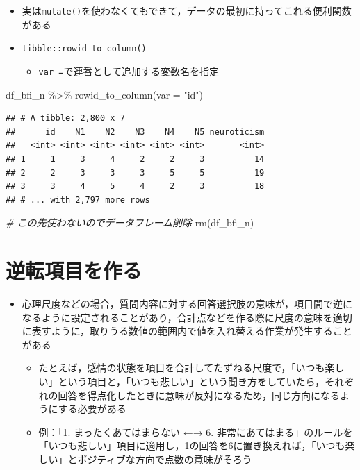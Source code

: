 \documentclass[
  xelatex,ja=standard, b5paper]{bxjsbook}
\newenvironment{Shaded}{\begin{snugshade}}{\end{snugshade}}
\newcommand{\AttributeTok}[1]{\textcolor[rgb]{0.77,0.63,0.00}{#1}}
\newcommand{\CommentTok}[1]{\textcolor[rgb]{0.56,0.35,0.01}{\textit{#1}}}
\newcommand{\FunctionTok}[1]{\textcolor[rgb]{0.00,0.00,0.00}{#1}}
\newcommand{\NormalTok}[1]{#1}
\newcommand{\SpecialCharTok}[1]{\textcolor[rgb]{0.00,0.00,0.00}{#1}}
\newcommand{\StringTok}[1]{\textcolor[rgb]{0.31,0.60,0.02}{#1}}
\providecommand{\tightlist}{%
  \setlength{\itemsep}{0pt}\setlength{\parskip}{0pt}}
\begin{document}
\begin{itemize}
\tightlist
\item
  実は\texttt{mutate()}を使わなくてもできて，データの最初に持ってこれる便利関数がある
\item
  \texttt{tibble::rowid\_to\_column()}

  \begin{itemize}
  \tightlist
  \item
    \texttt{var\ =}で連番として追加する変数名を指定
  \end{itemize}
\end{itemize}

\begin{Shaded}
\begin{Highlighting}[]
\NormalTok{df\_bfi\_n }\SpecialCharTok{\%\textgreater{}\%} 
  \FunctionTok{rowid\_to\_column}\NormalTok{(}\AttributeTok{var =} \StringTok{"id"}\NormalTok{)}
\end{Highlighting}
\end{Shaded}

\begin{verbatim}
## # A tibble: 2,800 x 7
##      id    N1    N2    N3    N4    N5 neuroticism
##   <int> <int> <int> <int> <int> <int>       <int>
## 1     1     3     4     2     2     3          14
## 2     2     3     3     3     5     5          19
## 3     3     4     5     4     2     3          18
## # ... with 2,797 more rows
\end{verbatim}

\begin{Shaded}
\begin{Highlighting}[]
\CommentTok{\# この先使わないのでデータフレーム削除}
\FunctionTok{rm}\NormalTok{(df\_bfi\_n)}
\end{Highlighting}
\end{Shaded}

\hypertarget{mu-rev}{%
\section{逆転項目を作る}\label{mu-rev}}

\begin{itemize}
\tightlist
\item
  心理尺度などの場合，質問内容に対する回答選択肢の意味が，項目間で逆になるように設定されることがあり，合計点などを作る際に尺度の意味を適切に表すように，取りうる数値の範囲内で値を入れ替える作業が発生することがある

  \begin{itemize}
  \tightlist
  \item
    たとえば，感情の状態を項目を合計してたずねる尺度で，「いつも楽しい」という項目と，「いつも悲しい」という聞き方をしていたら，それぞれの回答を得点化したときに意味が反対になるため，同じ方向になるようにする必要がある
  \item
    例：「1. まったくあてはまらない ←→ 6. 非常にあてはまる」のルールを「いつも悲しい」項目に適用し，1の回答を6に置き換えれば，「いつも楽しい」とポジティブな方向で点数の意味がそろう
  \end{itemize}
\end{itemize}
\end{document}

